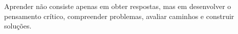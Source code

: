 
\begin{epigrafe}

\OnehalfSpacing
Aprender não consiste apenas em obter respostas, mas em desenvolver o pensamento crítico, compreender problemas, avaliar caminhos e construir soluções.

\end{epigrafe}
